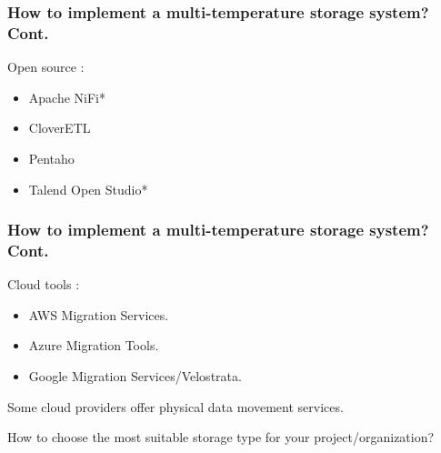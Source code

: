 
\begin{frame}
    \frametitle{How to implement a multi-temperature storage system? Cont.}
    \begin{wideitemize}
            \item Open source \forexample:
            \begin{itemize}
                \item Apache NiFi*
                \item CloverETL
                \item Pentaho
                \item Talend Open Studio*
            \end{itemize}
    \end{wideitemize}
\end{frame}


\begin{frame}
    \frametitle{How to implement a multi-temperature storage system? Cont.}
    \begin{wideitemize}
            \item Cloud tools \forexample:
            \begin{itemize}
                \item AWS Migration Services.
                \item Azure Migration Tools.
                \item Google Migration Services/Velostrata.
            \end{itemize}
            \item Some cloud providers offer physical data movement services.
            \item How to choose the most suitable storage type for your project/organization?
    \end{wideitemize}
\end{frame}


